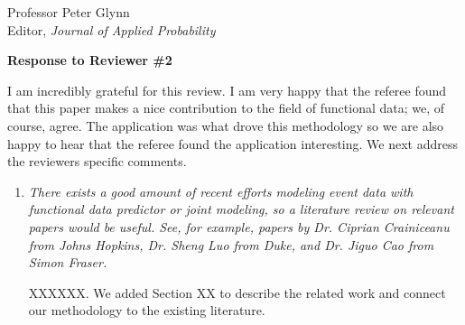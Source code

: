 \documentclass[11pt]{letter} %
\begin{document}
\begin{letter}{Professor
	Peter Glynn\\
	Editor, {\em Journal of Applied Probability}}
\newpage

{\bf Response to Reviewer \#2}

I am incredibly grateful for this review.  I am very happy that the referee found that this paper makes a nice contribution to the field of functional data; we, of course, agree. The application was what drove this methodology so we are also happy to hear that the referee found the application interesting. We next address the reviewers specific comments.

\begin{enumerate}
\item {\it There exists a good amount of recent efforts modeling event data with functional data predictor or joint modeling, so a literature review on relevant papers would be useful. See, for example, papers by Dr. Ciprian Crainiceanu from Johns Hopkins, Dr. Sheng Luo from Duke, and Dr. Jiguo Cao from Simon Fraser.}

\vspace{5mm}
XXXXXX.
We added Section XX to describe the related work and connect our methodology to the existing literature.
\vspace{5mm}
\end{enumerate}


\end{letter}
\end{document}
